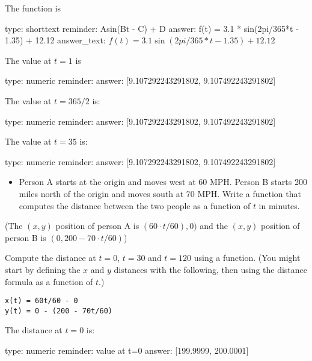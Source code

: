 \documentclass[12pt]{article}
\begin{document}
The function is

\begin{answer}
type: shorttext
reminder: Asin(Bt - C) + D
answer: f(t) = 3.1 * sin(2pi/365*t - 1.35) + 12.12
answer_text: \( f(t) = 3.1\sin(2pi/365*t - 1.35) + 12.12 \) 
\end{answer}

The value at $t=1$ is

\begin{answer}
    type: numeric
    reminder: 
    answer: [9.107292243291802, 9.107492243291802]

\end{answer}

The value at $t=365/2$ is:

\begin{answer}
    type: numeric
    reminder: 
    answer: [9.107292243291802, 9.107492243291802]

\end{answer}

The value at $t=35$ is:

\begin{answer}
    type: numeric
    reminder: 
    answer: [9.107292243291802, 9.107492243291802]

\end{answer}

\begin{itemize}
\itemsep1pt\parskip0pt
\item
  Person A starts at the origin and moves west at 60 MPH. Person B
  starts 200 miles north of the origin and moves south at 70 MPH. Write
  a function that computes the distance between the two people as a
  function of $t$ in minutes.
\end{itemize}

(The $(x,y)$ position of person A is $(60\cdot t/60), 0)$ and the
$(x,y)$ position of person B is $(0, 200 - 70 \cdot t/60)$)

Compute the distance at $t=0$, $t=30$ and $t=120$ using a function. (You
might start by defining the $x$ and $y$ distances with the following,
then using the distance formula as a function of $t$.)



\begin{verbatim}
x(t) = 60t/60 - 0
y(t) = 0 - (200 - 70t/60)
\end{verbatim}
The distance at $t=0$ is:

\begin{answer}
    type: numeric
    reminder: value at t=0
    answer: [199.9999, 200.0001]

\end{answer}
\end{document}
